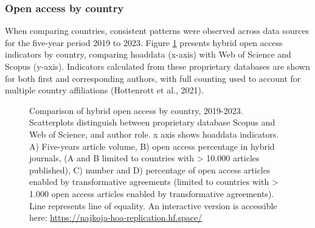 \documentclass[a4paper,man,floatsintext,longtable,noextraspace,10pt]{apa6}
\begin{document}
\subsubsection{Open access by country}\label{open-access-by-country}

When comparing countries, consistent patterns were observed across data
sources for the five-year period 2019 to 2023. Figure
\ref{fig-uptake_country} presents hybrid open access indicators by
country, comparing hoaddata (x-axis) with Web of Science and Scopus
(y-axis). Indicators calculated from these proprietary databases are
shown for both first and corresponding authors, with full counting used
to account for multiple country affiliations (Hottenrott et al., 2021).

\begin{figure}[ht!]


\caption{\label{fig-uptake_country}Comparison of hybrid open access by
country, 2019-2023. Scatterplots distinguish between proprietary
database Scopus and Web of Science, and author role. x axis shows
hoaddata indicators. A) Five-years article volume, B) open access
percentage in hybrid journals, (A and B limited to countries with
\textgreater{} 10.000 articles published), C) number and D) percentage
of open access articles enabled by transformative agreements (limited to
countries with \textgreater{} 1.000 open access articles enabled by
transformative agreements). Line represents line of equality. An
interactive version is accessible here:
\url{https://najkoja-hoa-replication.hf.space/}}

\end{figure}%
\end{document}
